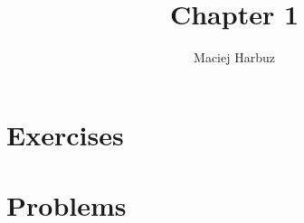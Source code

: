 \documentclass[12pt, a4paper]{article}
\title{Chapter 1}
\author{Maciej Harbuz}
\begin{document}
\maketitle

\section{Exercises}
%






\section{Problems}



\end{document}
